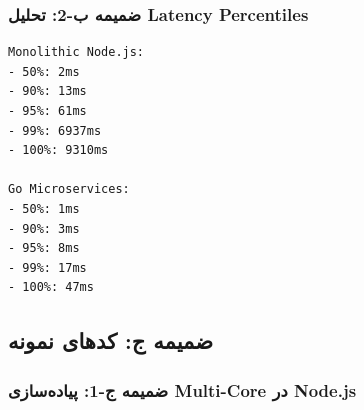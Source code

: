 \documentclass[
]{article}
\begin{document}
\subsubsection{ضمیمه ب-2: تحلیل Latency
Percentiles}\label{ux636ux645ux6ccux645ux647-ux628-2-ux62aux62dux644ux6ccux644-latency-percentiles}

\begin{verbatim}
Monolithic Node.js:
- 50%: 2ms
- 90%: 13ms
- 95%: 61ms
- 99%: 6937ms
- 100%: 9310ms

Go Microservices:
- 50%: 1ms
- 90%: 3ms
- 95%: 8ms
- 99%: 17ms
- 100%: 47ms
\end{verbatim}

\subsection{ضمیمه ج: کدهای
نمونه}\label{ux636ux645ux6ccux645ux647-ux62c-ux6a9ux62fux647ux627ux6cc-ux646ux645ux648ux646ux647}

\subsubsection{ضمیمه ج-1: پیاده‌سازی Multi-Core در
Node.js}\label{ux636ux645ux6ccux645ux647-ux62c-1-ux67eux6ccux627ux62fux647ux633ux627ux632ux6cc-multi-core-ux62fux631-node.js}
\end{document}
